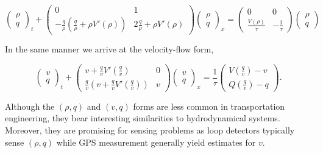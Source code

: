 \documentclass[5p,twocolumn]{elsarticle}
\begin{document}
{
\footnotesize
\begin{equation} \label{ARZrhoq}
\begin{pmatrix}
\rho \\ q
\end{pmatrix}_t
+ \begin{pmatrix}
0 & 1 \\
-\frac{q}{\rho} \left(\frac{q}{\rho} + \rho V'(\rho) \right) & 2\frac{q}{\rho} + \rho V'(\rho) 
\end{pmatrix}
\begin{pmatrix}
\rho \\ q
\end{pmatrix}_x = 
\begin{pmatrix}
0 & 0 \\ 
\frac{V(\rho)}{\tau} & -\frac{1}{\tau}
\end{pmatrix} 
\begin{pmatrix}
\rho \\ q
\end{pmatrix}
\end{equation}
}

In the same manner we arrive at the velocity-flow form,

{
\footnotesize
\begin{equation} \label{ARZvq}
\begin{pmatrix}
v \\ q
\end{pmatrix}_t
+ \begin{pmatrix}
v + \frac{q}{v} V'\left(\frac{q}{v}\right) & 0 \\
\frac{q}{v} \left( v + \frac{q}{v} V'\left(\frac{q}{v}\right)\right) & v
\end{pmatrix}
\begin{pmatrix}
v \\ q
\end{pmatrix}_x = 
\dfrac{1}{\tau}
\begin{pmatrix}
V\left( \frac{q}{v}\right) - v \\
Q\left( \frac{q}{v}\right) - q
\end{pmatrix}.
\end{equation}
}

Although the $\left(\rho, q\right)$ and $\left(v, q\right)$ forms are less common in transportation engineering, they bear interesting similarities to hydrodynamical systems. Moreover, they are promising for sensing problems as loop detectors typically sense $\left(\rho, q\right)$ while GPS measurement generally yield estimates for $v$.
\end{document}
